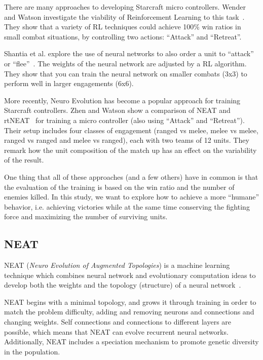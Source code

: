 There are many approaches to developing Starcraft micro
controllers. Wender and Watson investigate the viability of
Reinforcement Learning to this task~\cite{Wender12ReinforcementMicroSC}. They show that a
variety of RL techniques could achieve 100\% win ratios in small
combat situations, by controlling two actions: ``Attack'' and
``Retreat''.

Shantia et al. explore the use of neural networks to also order a unit
to ``attack'' or ``flee''~\cite{Shantia11ConnectionistSC}. The weights of the neural
network are adjusted by a RL algorithm. They show that you can train
the neural network on smaller combats (3x3) to perform well in larger
engagements (6x6).

More recently, Neuro Evolution has become a popular approach for
training Starcraft controllers. Zhen and Watson show a comparison of
NEAT and rtNEAT~\cite{Zhen13NeuroEvoSC} for training a micro controller (also
using ``Attack'' and ``Retreat''). Their setup includes four classes
of engagement (ranged vs melee, melee vs melee, ranged vs ranged and
melee vs ranged), each with two teams of 12 units. They remark how the
unit composition of the match up has an effect on the variability of
the result.

One thing that all of these approaches (and a few others) have in
common is that the evaluation of the training is based on the win
ratio and the number of enemies killed. In this study, we want to
explore how to achieve a more ``humane'' behavior, i.e. achieving
victories while at the same time conserving the fighting force and
maximizing the number of surviving units.

\subsection{NEAT}\label{subsec:neat}

NEAT (\emph{Neuro Evolution of Augmented Topologies}) is a machine
learning technique which combines neural network and evolutionary
computation ideas to develop both the weights and the topology
(structure) of a neural network~\cite{Stanley02Neat}.

NEAT begins with a minimal topology, and grows it through training in
order to match the problem difficulty, adding and removing neurons and
connections and changing weights. Self connections and connections to
different layers are possible, which means that NEAT can evolve
recurrent neural networks. Additionally, NEAT includes a speciation
mechanism to promote genetic diversity in the population.

